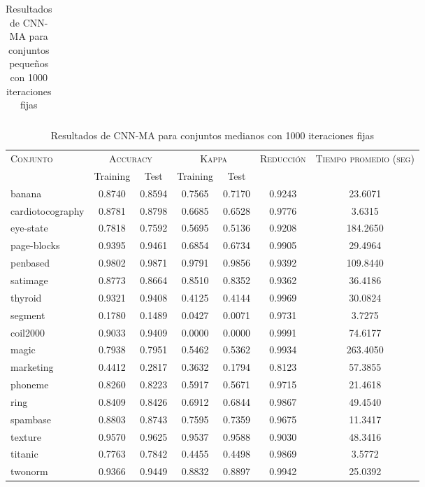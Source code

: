\begin{table}[]
\begin{tabular}{l c c c c c c}
\hline
\end{tabular}
\caption{Resultados de CNN-MA para conjuntos pequeños con 1000 iteraciones fijas}
\label{res-peq-CNN-MA}
\end{table}


\begin{table}[]
\centering
\begin{tabular}{l c c c c c c}
\hline
\multirow{2}{*}{\textsc{Conjunto}}
	& \multicolumn{2}{c}{\textsc{Accuracy}}
	& \multicolumn{2}{c}{\textsc{Kappa}}
	& \textsc{Reducción}
	& \textsc{Tiempo promedio (seg)} \\
	& Training & Test
	& Training & Test \\ 
\hline
\hline

banana & 0.8740 & 0.8594 & 0.7565 & 0.7170 & 0.9243 & 23.6071 \\
cardiotocography & 0.8781 & 0.8798 & 0.6685 & 0.6528 & 0.9776 & 3.6315 \\
eye-state & 0.7818 & 0.7592 & 0.5695 & 0.5136 & 0.9208 & 184.2650 \\
page-blocks & 0.9395 & 0.9461 & 0.6854 & 0.6734 & 0.9905 & 29.4964 \\
penbased & 0.9802 & 0.9871 & 0.9791 & 0.9856 & 0.9392 & 109.8440 \\
satimage & 0.8773 & 0.8664 & 0.8510 & 0.8352 & 0.9362 & 36.4186 \\
thyroid & 0.9321 & 0.9408 & 0.4125 & 0.4144 & 0.9969 & 30.0824 \\
segment & 0.1780 & 0.1489 & 0.0427 & 0.0071 & 0.9731 & 3.7275 \\
coil2000 & 0.9033 & 0.9409 & 0.0000 & 0.0000 & 0.9991 & 74.6177 \\
magic & 0.7938 & 0.7951 & 0.5462 & 0.5362 & 0.9934 & 263.4050 \\
marketing & 0.4412 & 0.2817 & 0.3632 & 0.1794 & 0.8123 & 57.3855 \\
phoneme & 0.8260 & 0.8223 & 0.5917 & 0.5671 & 0.9715 & 21.4618 \\
ring & 0.8409 & 0.8426 & 0.6912 & 0.6844 & 0.9867 & 49.4540 \\
spambase & 0.8803 & 0.8743 & 0.7595 & 0.7359 & 0.9675 & 11.3417 \\
texture & 0.9570 & 0.9625 & 0.9537 & 0.9588 & 0.9030 & 48.3416 \\
titanic & 0.7763 & 0.7842 & 0.4455 & 0.4498 & 0.9869 & 3.5772 \\
twonorm & 0.9366 & 0.9449 & 0.8832 & 0.8897 & 0.9942 & 25.0392 \\

\hline
\end{tabular}
\caption{Resultados de CNN-MA para conjuntos medianos con 1000 iteraciones fijas}
\label{res-med-CNN-MA}
\end{table}


